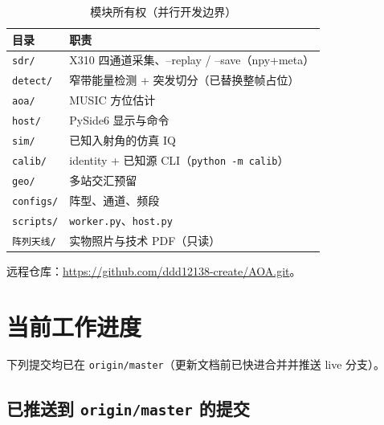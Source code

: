 \documentclass[UTF8,a4paper,12pt,zihao=-4]{ctexart}
\newcommand{\done}[1]{\textcolor{doneC}{#1}}
\newcommand{\upd}[1]{\textcolor{updC}{#1}}
\begin{document}
\begin{table}[htbp]
\centering
\caption{模块所有权（并行开发边界）}
\begin{tabular}{@{}lp{9.2cm}@{}}
\toprule
目录 & 职责 \\
\midrule
\texttt{sdr/} & \done{X310 四通道采集、--replay / --save（npy+meta）} \\
\texttt{detect/} & \done{窄带能量检测 + 突发切分（已替换整帧占位）} \\
\texttt{aoa/} & MUSIC 方位估计 \\
\texttt{host/} & PySide6 显示与命令 \\
\texttt{sim/} & 已知入射角的仿真 IQ \\
\texttt{calib/} & \done{identity + 已知源 CLI（\texttt{python -m calib}）} \\
\texttt{geo/} & 多站交汇预留 \\
\texttt{configs/} & 阵型、通道、频段 \\
\texttt{scripts/} & \texttt{worker.py}、\texttt{host.py} \\
\texttt{阵列天线/} & 实物照片与技术 PDF（只读） \\
\bottomrule
\end{tabular}
\end{table}

远程仓库：\url{https://github.com/ddd12138-create/AOA.git}。

\section{当前工作进度}

\upd{下列提交均已在 \texttt{origin/master}（更新文档前已快进合并并推送 live 分支）。}

\subsection{已推送到 \texttt{origin/master} 的提交}
\end{document}
